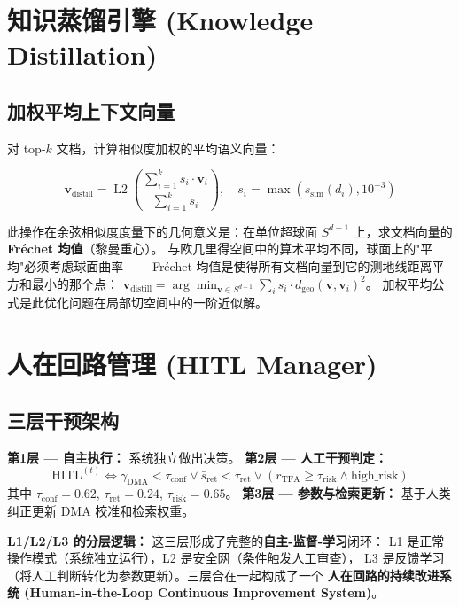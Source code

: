 \documentclass[11pt,a4paper]{ctexart}
\theoremstyle{remark}
\DeclareMathOperator{\Ltwo}{L2}
\begin{document}
\section{知识蒸馏引擎 (Knowledge Distillation)}

\subsection{加权平均上下文向量}

对 top-$k$ 文档，计算相似度加权的平均语义向量：

\begin{equation}
\mathbf{v}_{\text{distill}} = \Ltwo\left(\frac{\sum_{i=1}^{k} s_i \cdot \mathbf{v}_i}{\sum_{i=1}^{k} s_i}\right), \quad s_i = \max(s_{\text{sim}}(d_i), 10^{-3})
\end{equation}

此操作在余弦相似度度量下的几何意义是：在单位超球面 $S^{d-1}$ 上，求文档向量的 \textbf{Fr\'{e}chet 均值}（黎曼重心）。
与欧几里得空间中的算术平均不同，球面上的"平均"必须考虑球面曲率——
Fr\'{e}chet 均值是使得所有文档向量到它的测地线距离平方和最小的那个点：
$\mathbf{v}_{\text{distill}} = \arg\min_{\mathbf{v} \in S^{d-1}} \sum_i s_i \cdot d_{\text{geo}}(\mathbf{v}, \mathbf{v}_i)^2$。
加权平均公式是此优化问题在局部切空间中的一阶近似解。

\section{人在回路管理 (HITL Manager)}

\subsection{三层干预架构}

\textbf{第1层 — 自主执行：} 系统独立做出决策。
\textbf{第2层 — 人工干预判定：}
\begin{equation}
\text{HITL}^{(t)} \iff \gamma_{\text{DMA}} < \tau_{\text{conf}} \lor \bar{s}_{\text{ret}} < \tau_{\text{ret}} \lor (r_{\text{TFA}} \geq \tau_{\text{risk}} \land \text{high\_risk})
\end{equation}
其中 $\tau_{\text{conf}} = 0.62$, $\tau_{\text{ret}} = 0.24$, $\tau_{\text{risk}} = 0.65$。
\textbf{第3层 — 参数与检索更新：} 基于人类纠正更新 DMA 校准和检索权重。

\textbf{L1/L2/L3 的分层逻辑：} 这三层形成了完整的\textbf{自主-监督-学习}闭环：
L1 是正常操作模式（系统独立运行），L2 是安全网（条件触发人工审查），
L3 是反馈学习（将人工判断转化为参数更新）。三层合在一起构成了一个
\textbf{人在回路的持续改进系统 (Human-in-the-Loop Continuous Improvement System)}。
\end{document}
